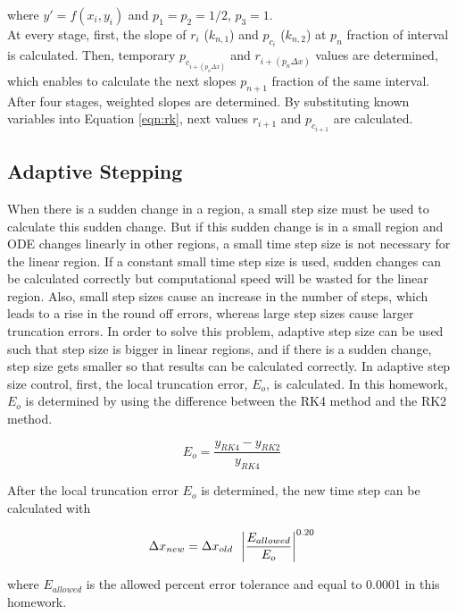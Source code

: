 \documentclass[letterpaper,12pt]{article}
\begin{document}
where $y\prime = f(x_i,y_i)$ and $p_1=p_2=1/2$, $p_3=1$.\\
At every stage, first, the slope of $r_i$ ($k_{n,1}$) and  $p_{c_{i}}$ ($k_{n,2}$) at $p_n$ fraction of interval is calculated. 
Then, temporary $p_{c_{i+(p_n\Delta x)}}$ and $r_{i+(p_n\Delta x)}$ values are determined, which enables to calculate the next 
slopes $p_{n+1}$ fraction of the same interval. After four stages, weighted slopes are determined. By substituting known 
variables into Equation \ref{eqn:rk}, next values $r_{i+1}$ and $p_{c_{i+1}}$ are calculated. 
\subsection{Adaptive Stepping}
\label{section:adaptive}

When there is a sudden change in a region, a small step size must be used to calculate this sudden change. 
But if this sudden change is in a small region and ODE changes linearly in other regions, a small time step size
is not necessary for the linear region. If a constant small time step size is used, sudden changes can be calculated correctly but 
computational speed will be wasted for the linear region. 
Also, small step sizes cause an increase in the number of steps, which leads to a
rise in the round off errors, whereas large step sizes cause larger truncation errors. 
In order to solve this problem, adaptive step size 
can be used such that step size is bigger in linear regions, and if there is a sudden change, step size gets
smaller so that results can be calculated correctly. 
In adaptive step size control, first, the local truncation error, $E_o$, is calculated. In this 
homework, $E_o$ is determined by using the difference between the RK4 method and the RK2 method.

\begin{equation}
	E_o = \frac{y_{RK4}-y_{RK2}}{y_{RK4}}
\end{equation}

After the local truncation error $E_o$ is determined, 
the new time step can be calculated with 

\begin{equation}
	\Delta x_{new} = \Delta x_{old} \hspace{0.5em} \left| \frac{E_{allowed}}{E_o}\right|^{0.20}
\end{equation}

where $E_{allowed}$ is the allowed percent error tolerance and equal to 0.0001 in this homework.
\end{document}
